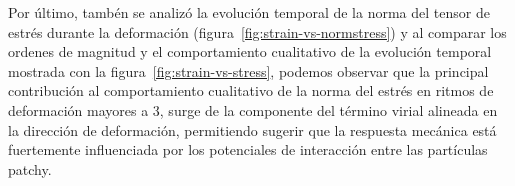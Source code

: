 \documentclass[../main.tex]{subfiles}
\begin{document}
Por último, tambén se analizó la evolución temporal de la norma del tensor de estrés durante la deformación (figura~\ref{fig:strain-vs-normstress}) y al comparar los ordenes de magnitud y el comportamiento cualitativo de la evolución temporal mostrada con la figura~\ref{fig:strain-vs-stress}, podemos observar que la principal contribución al comportamiento cualitativo de la norma del estrés en ritmos de deformación mayores a $3$, surge de la componente del término virial alineada en la dirección de deformación, permitiendo sugerir que la respuesta mecánica está fuertemente influenciada por los potenciales de interacción entre las partículas patchy.
\end{document}
